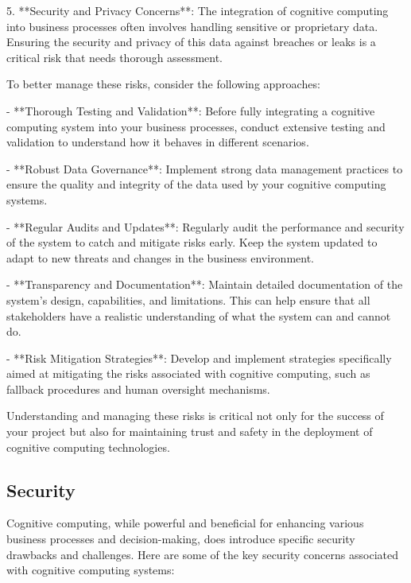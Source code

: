 \documentclass{article}
\begin{document}
5. **Security and Privacy Concerns**: The integration of cognitive computing into business processes often involves handling sensitive or proprietary data. Ensuring the security and privacy of this data against breaches or leaks is a critical risk that needs thorough assessment.

To better manage these risks, consider the following approaches:

- **Thorough Testing and Validation**: Before fully integrating a cognitive computing system into your business processes, conduct extensive testing and validation to understand how it behaves in different scenarios.
  
  - **Robust Data Governance**: Implement strong data management practices to ensure the quality and integrity of the data used by your cognitive computing systems.

  - **Regular Audits and Updates**: Regularly audit the performance and security of the system to catch and mitigate risks early. Keep the system updated to adapt to new threats and changes in the business environment.

  - **Transparency and Documentation**: Maintain detailed documentation of the system's design, capabilities, and limitations. This can help ensure that all stakeholders have a realistic understanding of what the system can and cannot do.

  - **Risk Mitigation Strategies**: Develop and implement strategies specifically aimed at mitigating the risks associated with cognitive computing, such as fallback procedures and human oversight mechanisms.

  Understanding and managing these risks is critical not only for the success of your project but also for maintaining trust and safety in the deployment of cognitive computing technologies.

\subsection{Security}

Cognitive computing, while powerful and beneficial for enhancing various business processes and decision-making, does introduce specific security drawbacks and challenges. Here are some of the key security concerns associated with cognitive computing systems:
\end{document}
